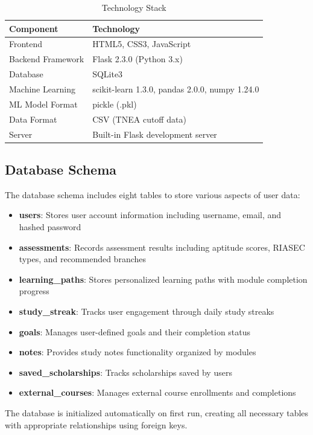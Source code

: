 \documentclass[journal]{IEEEtran}
\begin{document}
\begin{table}[htbp]
\caption{Technology Stack}
\begin{center}
\begin{tabular}{ll}
\hline
\textbf{Component} & \textbf{Technology} \\
\hline
Frontend & HTML5, CSS3, JavaScript \\
Backend Framework & Flask 2.3.0 (Python 3.x) \\
Database & SQLite3 \\
Machine Learning & scikit-learn 1.3.0, pandas 2.0.0, numpy 1.24.0 \\
ML Model Format & pickle (.pkl) \\
Data Format & CSV (TNEA cutoff data) \\
Server & Built-in Flask development server \\
\hline
\end{tabular}
\label{tab1}
\end{center}
\end{table}

\subsection{Database Schema}
The database schema includes eight tables to store various aspects of user data:

\begin{itemize}
\item \textbf{users}: Stores user account information including username, email, and hashed password
\item \textbf{assessments}: Records assessment results including aptitude scores, RIASEC types, and recommended branches
\item \textbf{learning\_paths}: Stores personalized learning paths with module completion progress
\item \textbf{study\_streak}: Tracks user engagement through daily study streaks
\item \textbf{goals}: Manages user-defined goals and their completion status
\item \textbf{notes}: Provides study notes functionality organized by modules
\item \textbf{saved\_scholarships}: Tracks scholarships saved by users
\item \textbf{external\_courses}: Manages external course enrollments and completions
\end{itemize}

The database is initialized automatically on first run, creating all necessary tables with appropriate relationships using foreign keys.
\end{document}
